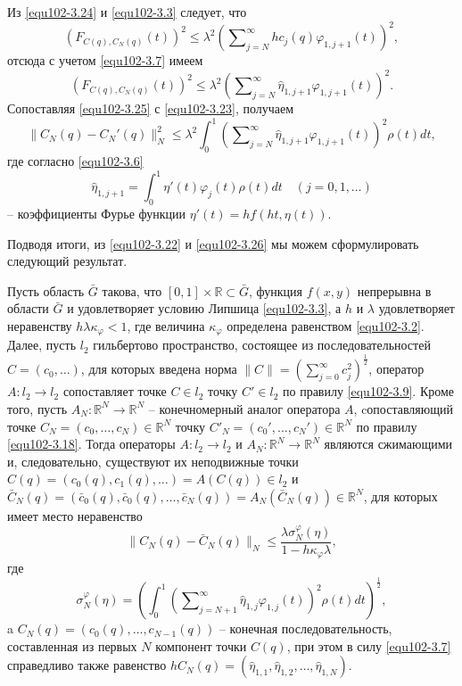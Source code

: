Из \eqref{equ102-3.24} и \eqref{equ102-3.3} следует, что
$$
(F_{C(q),C_N(q)}(t))^2\le \lambda^2   \left(\sum\nolimits_{j=N}^\infty hc_j(q)\varphi_{1,j+1}(t)\right)^2,
$$
отсюда с учетом \eqref{equ102-3.7} имеем
\begin{equation}\label{equ102-3.25}
(F_{C(q),C_N(q)}(t))^2\le \lambda^2   \left(\sum\nolimits_{j=N}^\infty  \hat \eta_{1,j+1}\varphi_{1,j+1}(t)\right)^2.
\end{equation}
Сопоставляя \eqref{equ102-3.25} с \eqref{equ102-3.23}, получаем
\begin{equation}\label{equ102-3.26}
\|C_N(q)- C_N'(q)\|_N^2\le \lambda^2\int_{0}^1\left(\sum\nolimits_{j=N}^\infty \hat \eta_{1,j+1} \varphi_{1,j+1}(t)\right)^2\rho(t) dt,
\end{equation}
где согласно \eqref{equ102-3.6}
\begin{equation}\label{equ102-3.27}
 \hat \eta_{1,j+1}=\int_{0}^1\eta'(t)\varphi_j(t)\rho(t)dt \quad(j=0,1,\ldots)
\end{equation}
-- коэффициенты Фурье функции $\eta'(t)=hf(ht,\eta(t))$.

Подводя итоги, из \eqref{equ102-3.22} и \eqref{equ102-3.26}  мы можем сформулировать следующий результат.
\begin{theorem}\label{equ102-th1}
Пусть область $\bar G$ такова, что $[0,1]\times\mathbb{R}\subset \bar G$, функция $f(x,y)$ непрерывна в области $\bar G$ и удовлетворяет условию Липшица \eqref{equ102-3.3}, а $h$ и $\lambda$ удовлетворяет неравенству $h\lambda\kappa_\varphi<1$, где величина $\kappa_\varphi$ определена равенством \eqref{equ102-3.2}. Далее, пусть $l_2$ гильбертово пространство, состоящее из последовательностей $C=(c_0,\ldots)$, для которых введена норма $\|C\|=\left(\sum_{j=0}^\infty c_j^2\right)^\frac12$,   оператор $A: l_2\to l_2$ сопоставляет точке $C\in l_2$ точку $C'\in l_2$ по правилу \eqref{equ102-3.9}. Кроме того, пусть $A_N:\mathbb{R}^N\to \mathbb{R}^N$ -- конечномерный аналог оператора $A$, cопоставляющий точке $C_N=(c_0,\ldots,c_{N})\in \mathbb{R}^N $ точку  $C'_N=(c_0',\ldots,c_{N}')\in \mathbb{R}^N $ по правилу \eqref{equ102-3.18}.
Тогда операторы $A: l_2\to l_2$ и $A_N:\mathbb{R}^N\to \mathbb{R}^N$ являются сжимающими и, следовательно, существуют  их неподвижные точки $C(q)=(c_0(q),c_1(q),\ldots)=A(C(q))\in l_2$ и $\bar C_N(q)=(\bar c_0(q),\bar c_0(q),\ldots,\bar c_{N}(q))=A_N(\bar C_N(q))\in \mathbb{R}^N$, для которых имеет место неравенство
\begin{equation}\label{equ102-3.28}
\|C_N(q)-\bar C_N(q)\|_N\le \frac{\lambda \sigma_N^\varphi(\eta)}{1-h\kappa_\varphi\lambda},
\end{equation}
где
\begin{equation}\label{equ102-3.29}
\sigma_N^\varphi(\eta)=\left(\int_{0}^1\left(\sum\nolimits_{j=N+1}^\infty \hat \eta_{1,j}\varphi_{1,j}(t)\right)^2\rho(t) dt\right)^\frac12,
\end{equation}
 a $C_N(q)=(c_0(q),\ldots,c_{N-1}(q))$ -- конечная последовательность, составленная из первых $N$ компонент точки  $C(q)$, при этом в силу  \eqref{equ102-3.7} справедливо также равенство  $hC_N(q)=(\hat \eta_{1,1},\hat \eta_{1,2}, \ldots, \hat \eta_{1,N})$.
\end{theorem}


